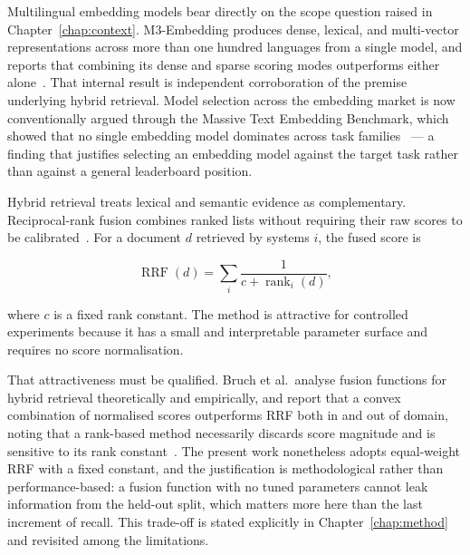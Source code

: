 Multilingual embedding models bear directly on the scope question raised in Chapter~\ref{chap:context}. M3-Embedding produces dense, lexical, and multi-vector representations across more than one hundred languages from a single model, and reports that combining its dense and sparse scoring modes outperforms either alone~\cite{chen2024m3embedding}. That internal result is independent corroboration of the premise underlying hybrid retrieval. Model selection across the embedding market is now conventionally argued through the Massive Text Embedding Benchmark, which showed that no single embedding model dominates across task families~\cite{muennighoff2023mteb} --- a finding that justifies selecting an embedding model against the target task rather than against a general leaderboard position.

Hybrid retrieval treats lexical and semantic evidence as complementary. Reciprocal-rank fusion combines ranked lists without requiring their raw scores to be calibrated~\cite{cormack2009rrf}. For a document $d$ retrieved by systems $i$, the fused score is

\begin{equation}
  \operatorname{RRF}(d) = \sum_i \frac{1}{c + \operatorname{rank}_i(d)},
  \label{eq:rrf}
\end{equation}

where $c$ is a fixed rank constant. The method is attractive for controlled experiments because it has a small and interpretable parameter surface and requires no score normalisation.

That attractiveness must be qualified. Bruch et al.\ analyse fusion functions for hybrid retrieval theoretically and empirically, and report that a convex combination of normalised scores outperforms \ac{RRF} both in and out of domain, noting that a rank-based method necessarily discards score magnitude and is sensitive to its rank constant~\cite{bruch2024fusion}. The present work nonetheless adopts equal-weight \ac{RRF} with a fixed constant, and the justification is methodological rather than performance-based: a fusion function with no tuned parameters cannot leak information from the held-out split, which matters more here than the last increment of recall. This trade-off is stated explicitly in Chapter~\ref{chap:method} and revisited among the limitations.

